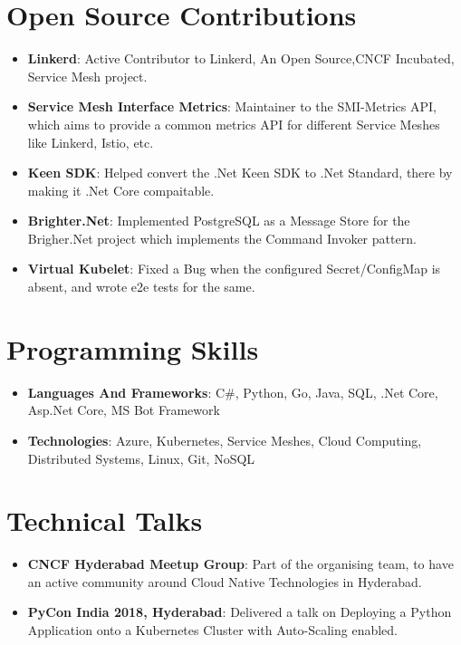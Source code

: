 \documentclass[letterpaper,11pt]{article}
\newcommand{\resumeItem}[2]{
  \item\small{
    \textbf{#1}{: #2 \vspace{-2pt}}
  }
}
\newcommand{\resumeSubItem}[2]{\resumeItem{#1}{#2}\vspace{-4pt}}
\newcommand{\resumeSubHeadingListStart}{\begin{itemize}[leftmargin=*]}
\newcommand{\resumeSubHeadingListEnd}{\end{itemize}}
\begin{document}
\section{Open Source Contributions}
  \resumeSubHeadingListStart
  \resumeSubItem{Linkerd}
  {Active Contributor to Linkerd, An Open Source,CNCF Incubated, Service Mesh project.}
  \resumeSubItem{Service Mesh Interface Metrics}
  {Maintainer to the SMI-Metrics API, which aims to provide a common metrics API for different Service Meshes like Linkerd, Istio, etc.}  
  \resumeSubItem{Keen SDK}
      {Helped convert the .Net Keen SDK to .Net Standard, there by making it .Net Core compaitable.}
    \resumeSubItem{Brighter.Net}
     {Implemented PostgreSQL as a Message Store for the Brigher.Net project which implements the Command Invoker pattern.}
     \resumeSubItem{Virtual Kubelet}
     {Fixed a Bug when the configured Secret/ConfigMap is absent, and wrote e2e tests for the same.}
    \resumeSubHeadingListEnd

    \section{Programming Skills}
      \resumeSubHeadingListStart
        \resumeSubItem{Languages And Frameworks}{C\#, Python, Go, Java, SQL, .Net Core, Asp.Net Core, MS Bot Framework }
        \resumeSubItem{Technologies}{Azure, Kubernetes, Service Meshes, Cloud Computing, Distributed Systems, Linux, Git, NoSQL}
        \resumeSubHeadingListEnd

\section{Technical Talks}
  \resumeSubHeadingListStart
  \resumeSubItem{CNCF Hyderabad Meetup Group}{ Part of the organising team, to have an active community around Cloud Native Technologies in Hyderabad. }
    \resumeSubItem{PyCon India 2018, Hyderabad}{Delivered a talk on Deploying a Python Application onto a Kubernetes Cluster with Auto-Scaling enabled. }
  \resumeSubHeadingListEnd



\end{document}
